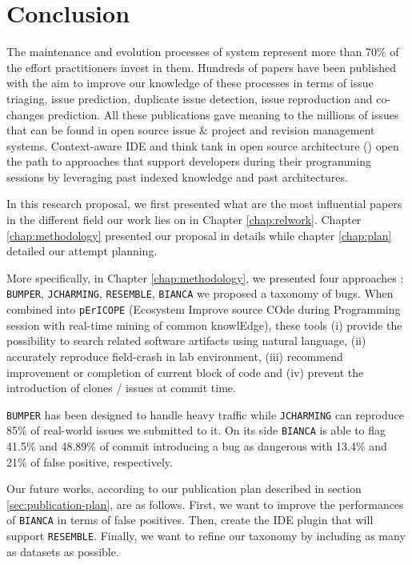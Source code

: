 
\chapter{Conclusion\label{chap:conclusion}}

The maintenance and evolution processes of system represent more than 70\% of the effort practitioners invest in them.
Hundreds of papers have been published with the aim to improve our knowledge of these processes in terms of issue triaging, issue prediction, duplicate issue detection, issue reproduction and co-changes prediction.
All these publications gave meaning to the millions of issues that can be found in open source issue \& project and revision management systems.
Context-aware IDE and think tank in open source architecture (\cite{chansler2011architecture}) open the path to approaches that support developers during their programming sessions by leveraging past indexed knowledge and past architectures.

In this research proposal, we first presented what are the most influential papers in the different field our work lies on in Chapter \ref{chap:relwork}.
Chapter \ref{chap:methodology} presented our proposal in details while chapter \ref{chap:plan} detailed our attempt planning.

More specifically, in Chapter \ref{chap:methodology}, we presented four approaches : {\tt BUMPER}, {\tt JCHARMING}, {\tt RESEMBLE}, {\tt BIANCA} we proposed a taxonomy of bugs. When combined into {\tt pErICOPE} (Ecosystem Improve source COde during Programming session with real-time mining of common knowlEdge), these tools (i) provide the possibility to search related software artifacts using natural language, (ii) accurately reproduce field-crash in lab environment, (iii) recommend improvement or completion of current block of code and (iv) prevent the introduction of clones / issues at commit time.


{\tt BUMPER} has been designed to handle heavy traffic while {\tt JCHARMING} can reproduce 85\% of real-world issues we submitted to it. On its side {\tt BIANCA} is able to flag 41.5\% and 48.89\% of commit introducing a bug as dangerous with 13.4\% and 21\% of false positive, respectively.

Our future works, according to our publication plan described in section \ref{sec:publication-plan}, are as follows. First, we want to improve the performances of {\tt BIANCA} in terms of false positives.
Then, create the IDE plugin that will support {\tt RESEMBLE}. Finally, we want to refine our taxonomy by including as many as datasets as possible.
